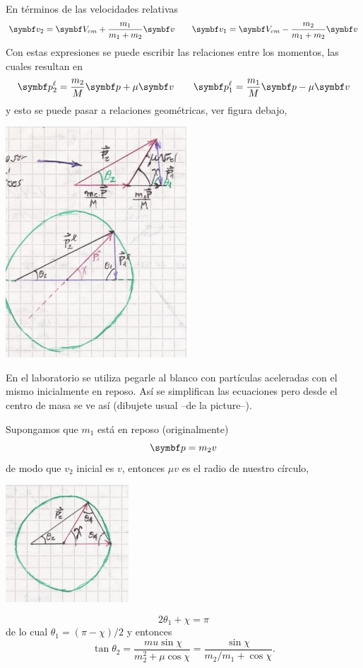 \documentclass[10pt,oneside]{CBFT_book}
\begin{document}

En términos de las velocidades relativas
\[
	\vb{v}_2 = \vb{V}_{cm} + \frac{m_1}{m_1 + m_2} \vb{v} \qquad 
	\vb{v}_1 = \vb{V}_{cm} -\frac{m_2}{m_1 + m_2} \vb{v}
\]
Con estas expresiones se puede escribir las relaciones entre los momentos, las cuales resultan en 
\[
	\vb{p}_2^\ell = \frac{m_2}{M} \vb{p} + \mu \vb{v} \qquad 
	\vb{p}_1^\ell = \frac{m_1}{M} \vb{p} - \mu \vb{v}
\]
y esto se puede pasar a relaciones geométricas, ver figura debajo,

\includegraphics[scale=0.4]{images/fig_mc_dispersion_triangulo1.jpg}

En el laboratorio se utiliza pegarle al blanco con partículas aceleradas con el mismo
inicialmente en reposo. Así se simplifican las ecuaciones pero desde el centro de masa
se ve así (dibujete usual --de la picture--).

Supongamos que $m_1$ está en reposo (originalmente)
\[
	\vb{p} = m_2 v
\]
de modo que $v_2$ inicial es $v$, entonces $\mu v$ es el radio de nuestro círculo,

\includegraphics[scale=0.4]{images/fig_mc_dispersion_scatt_circulo.jpg}

\[
	2 \theta_1 + \chi = \pi
\]
de lo cual $\theta_1 = ( \pi - \chi ) / 2$ y entonces 
\[
	\tan \theta_2 = \frac{ \ mu \sin \chi }{ m_2^2 + \mu \cos \chi} =
	\frac{ \sin \chi }{ m_2 / m_1 + \cos \chi }.
\]
\end{document}
